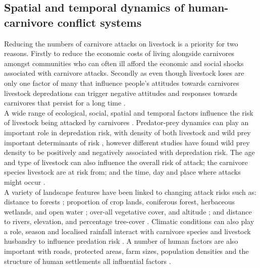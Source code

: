 \subsection{Spatial and temporal dynamics of human-carnivore conflict systems}

Reducing the numbers of carnivore attacks on livestock is a priority for two reasons. Firstly to reduce the economic costs of living alongside carnivores amongst communities who can often ill afford the economic and social shocks associated with carnivore attacks. Secondly as even though livestock loses are only one factor of many that influence people's attitudes towards carnivores \citep{Dickman2010b,Inskip2016,Bruskotter2014d} livestock depredations can trigger negative attitudes and responses towards carnivores that persist for a long time \citep{Marker2003,Dickman2014d}.\\

A wide range of ecological, social, spatial and temporal factors influence the risk of livestock being attacked by carnivores \citep{Miller2015}. Predator-prey dynamics can play an important role in depredation risk, with density of both livestock and wild prey important determinants of risk \citep{Hemson2003,Zarco-Gonzalez2013}, however different studies have found wild prey density to be positively \citep{Kolowski2006,Treves2015,Zarco-Gonzalez2013} and negatively \citep{Hemson2003} associated with depredation risk. The age and type of livestock can also influence the overall risk of attack; the carnivore species livestock are at risk from; and the time, day and place where attacks might occur \citep{DeAzevedo2007,Ogada2003}. \\

A variety of landscape features have been linked to changing attack risks such as: distance to forests \citep{DeAzevedo2007}; proportion of crop lands, coniferous forest, herbaceous wetlands, and open water \citep{Treves2015}; over-all vegetative cover, and altitude \citep{Zarco-Gonzalez2013}; and distance to rivers, elevation, and percentage tree-cover \citep{Abade2014h}. Climatic conditions can also play a role, season and localised rainfall interact with carnivore species and livestock husbandry to influence predation risk \citep{Kissui2008,Abade2014h}. A number of human factors are also important with roads, protected areas, farm sizes, population densities and the structure of human settlements all influential factors \citep{Treves2015,Zarco-Gonzalez2012,Holmern2007a}.\\

